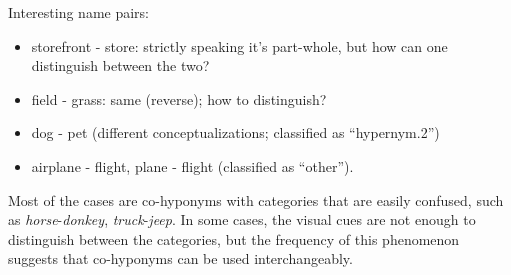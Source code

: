 Interesting name pairs:

\begin{itemize}
\item storefront - store: strictly speaking it's part-whole, but how can one distinguish between the two? 
\item field - grass: same (reverse); how to distinguish?
\item dog - pet (different conceptualizations; classified as ``hypernym.2'')
\item airplane - flight, plane - flight (classified as ``other'').
\end{itemize}


Most of the cases are co-hyponyms with categories that are easily confused, such as \textit{horse}-\textit{donkey}, \textit{truck}-\textit{jeep}.
In some cases, the visual cues are not enough to distinguish between the categories, but the frequency of this phenomenon suggests that co-hyponyms can be used interchangeably.


